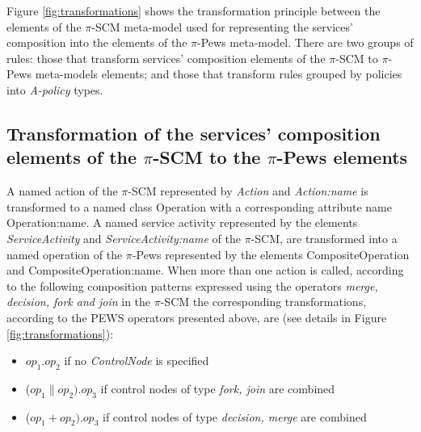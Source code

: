 Figure \ref{fig:transformations} shows the transformation principle between the elements of the $\pi$-SCM meta-model used for representing the services' composition into the elements of the $\pi$-{\sc Pews} meta-model. There are two groups of rules: those that transform services' composition elements of the $\pi$-SCM to $\pi$-{\sc Pews} meta-models elements; and those that transform rules grouped by policies into {\em A-policy} types.


\subsection{Transformation of the services' composition elements of the $\pi$-SCM to the $\pi$-{\sc Pews} elements}
A named action of the $\pi$-SCM represented by  {\sc\em Action} and {\sc\em Action:name} is transformed to a  named class {\sc Operation} with a corresponding attribute name {\sc Operation:name}. A  named service activity represented by the elements {\sc\em ServiceActivity}  and  {\sc\em ServiceActivity:name} of the $\pi$-SCM, are  transformed into a named operation of the $\pi$-{\sc Pews} represented by the elements  {\sc CompositeOperation} and {\sc CompositeOperation:name}. When more than one action is called, according to the following  composition patterns expressed using the operators {\sc\em merge, decision, fork and join} in the $\pi$-SCM the corresponding transformations, according to the PEWS operators presented above, are (see details in Figure \ref{fig:transformations}):
\begin{itemize}
\item   $op_1 . op_2$ if no {\sc\em ControlNode} is specified
\item ($op_1 \parallel op_2) . op_3$ if control nodes of type {\sc\em fork, join} are combined
 \item ($op_1 + op_2) . op_3$ if control nodes of type {\sc\em decision, merge} are combined
\end{itemize}

